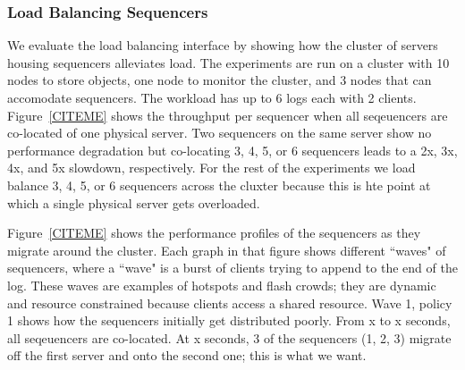 \documentclass[preprint]{sigplanconf-eurosys}
\begin{document}
\subsubsection{Load Balancing Sequencers}

We evaluate the load balancing interface by showing how the cluster of servers
housing sequencers alleviates load.  The experiments are run on a cluster with
10 nodes to store objects, one node to monitor the cluster, and 3 nodes that
can accomodate sequencers. The workload has up to 6 logs each with 2 clients.
Figure~\ref{CITEME} shows the throughput per sequencer when all seqeuencers are
co-located of one physical server. Two sequencers on the same server show no
performance degradation but co-locating 3, 4, 5, or 6 sequencers leads to a
2x, 3x, 4x, and 5x slowdown, respectively. For the rest of the experiments we
load balance 3, 4, 5, or 6 sequencers across the cluxter because this is hte
point at which a single physical server gets overloaded.

Figure~\ref{CITEME} shows the performance profiles of the sequencers as they
migrate around the cluster. Each graph in that figure shows different ``waves"
of sequencers, where a ``wave" is a burst of clients trying to append to the
end of the log. These waves are examples of hotspots and flash crowds; they are
dynamic and resource constrained because clients access a shared resource. Wave
1, policy 1 shows how the sequencers initially get distributed poorly. From x
to x seconds, all seqeuencers are co-located. At x seconds, 3 of the sequencers
(1, 2, 3) migrate off the first server and onto the second one; this is what we
want.
\end{document}
